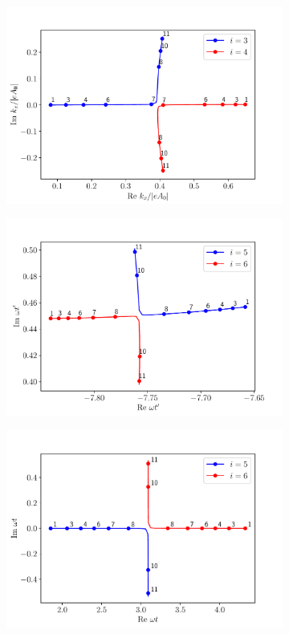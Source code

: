 \begin{figure}
\begin{subfigure}[b]{0.33\linewidth}
  \includegraphics[width=\textwidth]{figures/ch_ATI_SPA/rescattering/momentum34.pdf}
\end{subfigure}
\begin{subfigure}[b]{0.33\linewidth}
  \includegraphics[width=\textwidth]{figures/ch_ATI_SPA/rescattering/start56.pdf}
\end{subfigure}
\begin{subfigure}[b]{0.33\linewidth}
  \includegraphics[width=\textwidth]{figures/ch_ATI_SPA/rescattering/return56.pdf}

\end{subfigure}
\end{figure}
